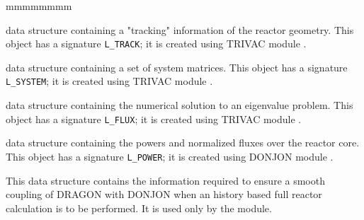 \begin{ListeDeDescription}{mmmmmmmm}
\item[\dds{track}] data structure containing a "tracking" information
of the reactor geometry. This object has a signature {\tt L\_TRACK};
it is created using TRIVAC module .

\item[\dds{system}] data structure containing a set of system matrices.
This object has a signature {\tt L\_SYSTEM}; it is created using
TRIVAC module .

\item[\dds{flux}] data structure containing the numerical solution to
an eigenvalue problem. This object has a signature {\tt L\_FLUX};
it is created using TRIVAC module .

\item[\dds{power}] data structure containing the powers and normalized
fluxes over the reactor core. This object has a signature {\tt L\_POWER};
it is created using DONJON module .

\item[\dds{history}] This data structure contains the information required to ensure a smooth coupling of
DRAGON with DONJON when an history based full reactor calculation is to be performed. It is used only by the
 module.

\end{ListeDeDescription}
